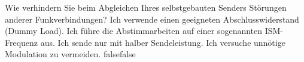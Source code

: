     {Wie verhindern Sie beim Abgleichen Ihres selbstgebauten Senders Störungen anderer Funkverbindungen?}
    {Ich verwende einen geeigneten Abschlusswiderstand (Dummy Load).}
    {Ich führe die Abstimmarbeiten auf einer sogenannten ISM-Frequenz aus.}
    {Ich sende nur mit halber Sendeleistung.}
    {Ich versuche unnötige Modulation zu vermeiden.}
    {false}{false}